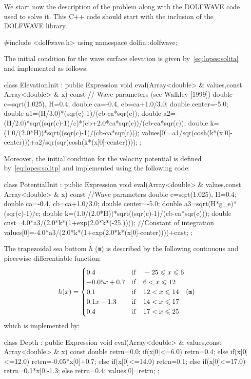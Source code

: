 We start now  the description of the problem along with the DOLFWAVE code used to
solve it. This C++ code should start with the inclusion of
the DOLFWAVE library.
\begin{c++}
#include <dolfwave.h>
using namespace dolfin::dolfwave;
\end{c++}
The initial condition for the wave surface elevation is
given by~\eqref{eq:lopes:solita} and implemented as follows:
\begin{c++}
class ElevationInit : public Expression
{
  void eval(Array<double> & values,const Array<double> & x) const
  { // Wave parameters (see Walkley [1999])
    double c=sqrt(1.025), H=0.4;
    double ca=-0.4, cb=ca+1.0/3.0;
    double center=-5.0;
    double a1=(H/3.0)*(sqr(c)-1)/(cb-ca*sqr(c));
    double a2=-(H/2.0)*sqr((sqr(c)-1)/c)*(cb+2.0*ca*sqr(c))/(cb-ca*sqr(c));
    double k=(1.0/(2.0*H))*sqrt((sqr(c)-1)/(cb-ca*sqr(c)));
    values[0]=a1/sqr(cosh(k*(x[0]-center)))+a2/sqr(sqr(cosh(k*(x[0]-center))));
  }
};
\end{c++}
Moreover, the initial condition for the velocity potential
is defined by~\eqref{eq:lopes:solitp} and implemented using
the following code:
\begin{c++}
class PotentialInit :  public Expression
{
  void eval(Array<double> & values,const Array<double> & x) const
  { //Wave parameters
    double c=sqrt(1.025), H=0.4;
    double ca=-0.4, cb=ca+1.0/3.0;
    double center=-5.0;
    double a3=sqrt(H*g_e)*(sqr(c)-1)/c;
    double k=(1.0/(2.0*H))*sqrt((sqr(c)-1)/(cb-ca*sqr(c)));
    double cnst=4.0*a3/(2.0*k*(1+exp(2.0*k*(-25.)))); //Constant of integration
    values[0]=-4.0*a3/(2.0*k*(1+exp(2.0*k*(x[0]-center))))+cnst;
  }
};
\end{c++}
The trapezoidal sea bottom $h$ ({\tt m})  is described by the following
continuous and piecewise differentiable function:
\begin{equation}\label{eq:lopes:piecewisebottom}
h(x)=\begin{cases}
0.4& {\rm if}\quad -25 \leqslant x\leqslant 6\\
-0.05x+0.7& {\rm if}\quad 6< x\leqslant 12\\
0.1& {\rm if}\quad 12< x\leqslant 14\\
0.1x-1.3& {\rm if}\quad 14< x\leqslant 17\\
0.4& {\rm if}\quad 17< x\leqslant 25
\end{cases}  ({\tt m})
\end{equation}
which is implemented by:
\begin{c++}
class Depth :  public Expression
{
  void eval(Array<double> & values,const Array<double> & x) const
  {
    double retrn=0.0;
    if(x[0]<=6.0)
      retrn=0.4;
    else if(x[0]<=12.0)
      retrn=-0.05*x[0]+0.7;
    else if(x[0]<=14.0)
      retrn=0.1;
    else if(x[0]<=17.0)
      retrn=0.1*x[0]-1.3;
    else retrn=0.4;
    values[0]=retrn;
  }
};
\end{c++}
